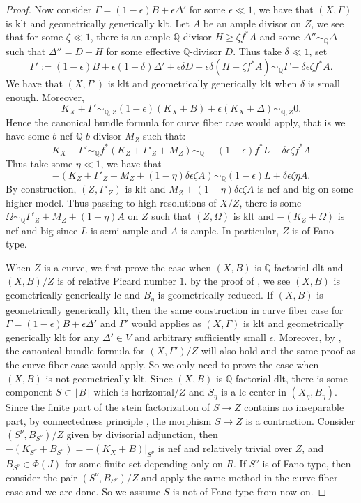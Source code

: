 \documentclass[letterpaper,reqno,12pt]{amsart}
\numberwithin{equation}{section}
\theoremstyle{plain}
\begin{document}
\begin{proof}
    Now consider $\Gamma=(1-\epsilon)B+\epsilon\Delta'$ for some $\epsilon\ll 1$, we have that $(X,\Gamma)$ is klt and geometrically generically klt. Let $A$ be an ample divisor on $Z$, we see that for some $\zeta\ll 1$, there is an ample ${\mathbb Q}$-divisor $H\geq \zeta f^*A$ and some $\Delta''\sim_{\mathbb Q} \Delta$ such that $\Delta''=D+H$ for some effective ${\mathbb Q}$-divisor $D$. Thus take $\delta\ll 1$, set \[\Gamma':=(1-\epsilon)B+\epsilon(1-\delta)\Delta'+\epsilon\delta D+\epsilon\delta(H-\zeta f^*A)\sim_{\mathbb Q}\Gamma-\delta\epsilon\zeta f^*A.\]
    We have that $(X,\Gamma')$ is klt and geometrically generically klt when $\delta$ is small enough. Moreover, \[K_X+\Gamma'\sim_{{\mathbb Q},Z}(1-\epsilon)(K_X+B)+\epsilon(K_X+\Delta)\sim_{{\mathbb Q},Z}0.\]
    Hence the canonical bundle formula for curve fiber case would apply, that is we have some $b$-nef ${\mathbb Q}$-$b$-divisor $M_Z$ such that:
    \[K_X+\Gamma'\sim_{\mathbb Q}f^*(K_Z+\Gamma'_Z+M_Z)\sim_{\mathbb Q} -(1-\epsilon)f^*L-\delta\epsilon\zeta f^*A\]
    Thus take some $\eta\ll 1$, we have that 
    \[-(K_Z+\Gamma'_Z+M_Z+(1-\eta)\delta\epsilon\zeta A)\sim_{\mathbb Q}(1-\epsilon)L+\delta\epsilon\zeta\eta A.\]
    By construction, $(Z,\Gamma'_Z)$ is klt and $M_Z+(1-\eta)\delta\epsilon\zeta A$ is nef and big on some higher model. Thus passing to high resolutions of $X/Z$, there is some $\Omega\sim_{\mathbb Q}\Gamma'_Z+M_Z+(1-\eta)A$ on $Z$ such that $(Z,\Omega)$ is klt and $-(K_Z+\Omega)$ is nef and big since $L$ is semi-ample and $A$ is ample. In particular, $Z$ is of Fano type.

    When $Z$ is a curve, we first prove the case when $(X,B)$ is $\mathbb Q$-factorial dlt and $(X,B)/Z$ is of relative Picard number $1$. by the proof of , we see $(X,B)$ is geometrically generically lc and $B_\eta$ is geometrically reduced. If $(X,B)$ is geometrically generically klt, then the same construction in curve fiber case for $\Gamma=(1-\epsilon)B+\epsilon \Delta'$ and $\Gamma'$ would applies as $(X,\Gamma)$ is klt and geometrically generically klt for any $\Delta'\in V$ and arbitrary sufficiently small $\epsilon$. Moreover, by \cite[0.2]{benozzocanonicalbundleformula}, the canonical bundle formula for $(X,\Gamma')/Z$ will also hold and the same proof as the curve fiber case would apply. So we only need to prove the case when $(X,B)$ is not geometrically klt. Since $(X,B)$ is $\mathbb Q$-factorial dlt, there is some component $S\subset\lfloor B\rfloor$ which is horizontal$/Z$ and $S_\eta$ is a lc center in $(X_\eta,B_\eta)$. Since the finite part of the stein factorization of $S\to Z$ contains no inseparable part, by connectedness principle \cite[1.2]{YH17wittnadelvanishing}, the morphism $S\to Z$ is a contraction. Consider $(S^\nu,B_{S^\nu})/Z$ given by divisorial adjunction,  then $-(K_{S^\nu}+B_{S^\nu})=-(K_X+B)|_{S^\nu}$ is nef and relatively trivial over $Z$, and $B_{S^\nu}\in\Phi(J)$ for some finite set depending only on $R$. If $S^\nu$ is of Fano type, then consider the pair $(S^\nu,B_{S^\nu})/Z$ and apply the same method in the curve fiber case and we are done. So we assume $S$ is not of Fano type from now on.  
    

\end{proof}
\end{document}
